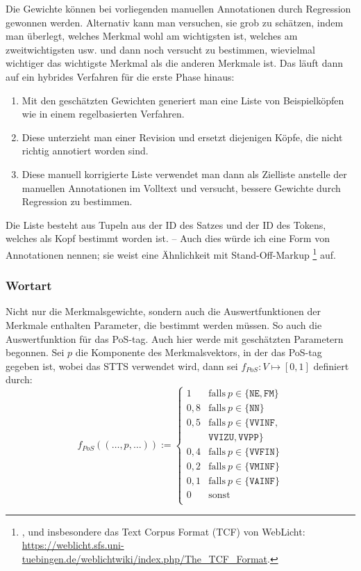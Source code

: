 \documentclass{article}
\renewcommand*{\see}{\autocap{v}gl\adddot}%
\begin{document}
Die Gewichte können bei vorliegenden manuellen Annotationen durch
Regression gewonnen werden. Alternativ kann man versuchen, sie grob zu
schätzen, indem man überlegt, welches Merkmal wohl am wichtigsten ist,
welches am zweitwichtigsten usw. und dann noch versucht zu bestimmen,
wievielmal wichtiger das wichtigste Merkmal als die anderen Merkmale
ist. Das läuft dann auf ein hybrides Verfahren für die erste Phase
hinaus:
\begin{enumerate}%
\item Mit den geschätzten Gewichten generiert man eine Liste von
  Beispielköpfen wie in einem regelbasierten Verfahren.
\item Diese unterzieht man einer Revision
  und ersetzt diejenigen Köpfe, die nicht richtig annotiert worden
  sind.
\item Diese manuell korrigierte Liste verwendet man dann als Zielliste
  anstelle der manuellen Annotationen im Volltext und versucht,
  bessere Gewichte durch Regression zu bestimmen.
\end{enumerate}
Die Liste besteht aus Tupeln aus der ID des Satzes und der ID des
Tokens, welches als Kopf bestimmt worden ist. -- Auch dies würde ich
eine Form von Annotationen nennen; sie weist eine Ähnlichkeit mit
Stand-Off-Markup%
\footnote{\Cite[\see\ z.\,B.][575--579]{TEIP5}, und insbesondere das
  Text Corpus Format (TCF) von WebLicht:
  \url{https://weblicht.sfs.uni-tuebingen.de/weblichtwiki/index.php/The_TCF_Format}.} %
auf.


\subsubsection{Wortart}

Nicht nur die Merkmalsgewichte, sondern auch die Auswertfunktionen der
Merkmale enthalten Parameter, die bestimmt werden müssen. So auch die
Auswertfunktion für das PoS-tag. Auch hier werde mit geschätzten
Parametern begonnen.  Sei $p$ die Komponente des Merkmalsvektors, in
der das PoS-tag gegeben ist, wobei das STTS \parencite{Schiller1999a}
verwendet wird, dann sei $f_{PoS}:V\mapsto [0,1]$ definiert durch:
\begin{equation}
  \label{eq:pos}
  f_{PoS}((\dots,p,\dots)) := \left\{
    \begin{array}{ll}
      1 & \mathrm{falls~} p \in \{\mathtt{NE,FM}\} \\
      0,8 & \mathrm{falls~} p \in \{\mathtt{NN}\} \\
      0,5 & \mathrm{falls~} p \in \{\mathtt{VVINF,}\\ ~ & \mathtt{VVIZU,VVPP}\} \\
      0,4 & \mathrm{falls~} p \in \{\mathtt{VVFIN}\} \\
      0,2 & \mathrm{falls~} p \in \{\mathtt{VMINF}\} \\
      0,1 & \mathrm{falls~} p \in \{\mathtt{VAINF}\} \\
      0 & \mathrm{sonst} \\
    \end{array}\right.
\end{equation}
\end{document}
